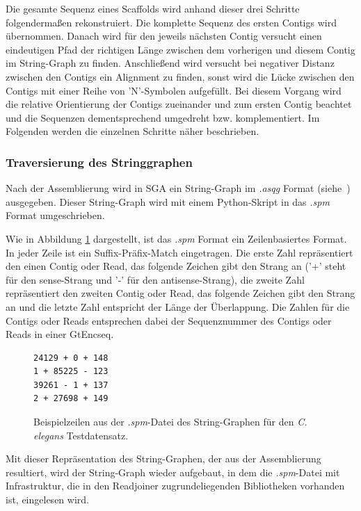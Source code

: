 \documentclass[a4paper,10pt,parskip]{scrartcl}
\begin{document}
Die gesamte Sequenz eines Scaffolds wird anhand dieser drei Schritte
folgendermaßen rekonstruiert. Die komplette Sequenz des ersten Contigs
wird übernommen. Danach wird für den jeweils nächsten Contig versucht
einen eindeutigen Pfad der richtigen Länge zwischen dem vorherigen und
diesem Contig im String-Graph zu finden. Anschließend wird versucht
bei negativer Distanz zwischen den Contigs ein Alignment zu finden,
sonst wird die Lücke zwischen den Contigs mit einer Reihe von
'N'-Symbolen aufgefüllt. Bei diesem Vorgang wird die relative
Orientierung der Contigs zueinander und zum ersten Contig beachtet und
die Sequenzen dementsprechend umgedreht 
bzw. komplementiert. Im Folgenden werden die einzelnen
Schritte näher beschrieben.

\subsubsection{Traversierung des Stringgraphen}
Nach der Assemblierung wird in SGA ein String-Graph im \textit{.asqg}
Format (siehe~\cite{asqg}) ausgegeben. Dieser String-Graph wird mit
einem Python-Skript in das \textit{.spm} Format umgeschrieben.

Wie in Abbildung \ref{abb: spm} dargestellt, ist das \textit{.spm}
Format ein Zeilenbasiertes Format. In jeder Zeile ist ein
Suffix-Präfix-Match eingetragen. Die erste Zahl repräsentiert den
einen Contig oder Read, das folgende Zeichen gibt den Strang an ('+'
steht für den sense-Strang und '-' für den antisense-Strang), die
zweite Zahl repräsentiert den zweiten Contig oder Read, das folgende
Zeichen gibt den Strang an und die letzte Zahl entspricht der Länge
der Überlappung. Die Zahlen für die Contigs oder Reads entsprechen
dabei der Sequenznummer des Contigs oder Reads in einer GtEncseq.

\begin{figure}
  \centering
\begin{verbatim}
24129 + 0 + 148
1 + 85225 - 123
39261 - 1 + 137
2 + 27698 + 149
\end{verbatim}
\caption{\label{abb: spm}Beispielzeilen aus der \textit{.spm}-Datei des
  String-Graphen für den \textit{C. elegans} Testdatensatz.}
\end{figure}

Mit dieser Repräsentation des String-Graphen, der aus der
Assemblierung resultiert, wird der String-Graph wieder aufgebaut, in
dem die \textit{.spm}-Datei mit Infrastruktur, die in den Readjoiner
zugrundeliegenden Bibliotheken vorhanden ist, eingelesen wird.
\end{document}
